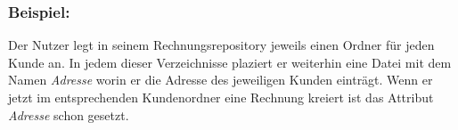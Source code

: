 \subsubsection*{Beispiel:}
Der Nutzer legt in seinem Rechnungsrepository jeweils einen Ordner für jeden Kunde
an. In jedem dieser Verzeichnisse plaziert er weiterhin eine Datei mit dem Namen
\emph{Adresse} worin er die Adresse des jeweiligen Kunden einträgt. Wenn er jetzt
im entsprechenden Kundenordner eine Rechnung kreiert ist das Attribut \emph{Adresse}
schon gesetzt.
